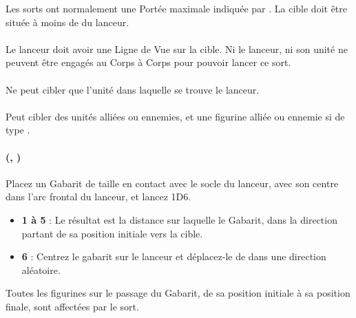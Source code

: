Les sorts ont normalement une Portée maximale indiquée par \og {} \fg{}. La cible doit être située à moins de  du lanceur.

\paragraph{\missile}

Le lanceur doit avoir une Ligne de Vue sur la cible. Ni le lanceur, ni son unité ne peuvent être engagés au Corps à Corps pour pouvoir lancer ce sort.

\paragraph{\castersunit}

Ne peut cibler que l'unité dans laquelle se trouve le lanceur.

\paragraph{\universal}

Peut cibler des unités alliées ou ennemies, et une figurine alliée ou ennemie si de type \focused{}.

\paragraph{\vortex{} (, \template{} )}

Placez un Gabarit de taille  en contact avec le socle du lanceur, avec son centre dans l'arc frontal du lanceur, et lancez 1D6.
\begin{itemize}[label={-}]
\item \textbf{1 à 5} :  Le résultat est la distance sur laquelle le Gabarit, dans la direction partant de sa position initiale vers la cible.
\item \textbf{6} : Centrez le gabarit sur le lanceur et déplacez-le de  dans une direction aléatoire.
\end{itemize}

Toutes les figurines sur le passage du Gabarit, de sa position initiale à sa position finale, sont affectées par le sort. 


